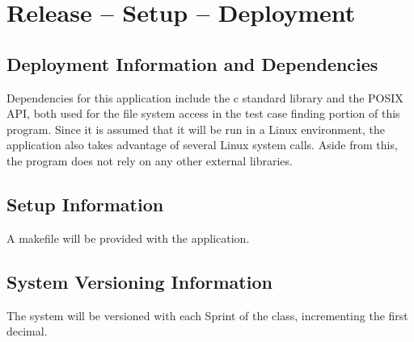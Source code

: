 
\chapter{Release -- Setup -- Deployment}


\section{Deployment Information and Dependencies}
Dependencies for this application include the c standard library and the POSIX API, both used for the
file system access in the test case finding portion of this program. Since it is assumed that it will be run
in a Linux environment, the application also takes advantage of several Linux system calls. Aside from this,
the program does not rely on any other external libraries.



\section{Setup Information}
A makefile will be provided with the application.



\section{System  Versioning Information}
The system will be versioned with each Sprint of the class, incrementing the first decimal.
